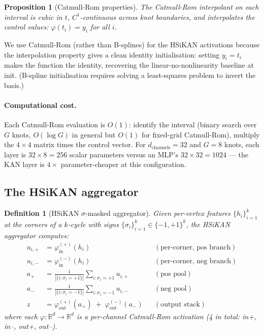 \documentclass[11pt,a4paper]{article}
\newtheorem{definition}[theorem]{Definition}
\newtheorem{proposition}[theorem]{Proposition}
\theoremstyle{remark}
\newcommand{\R}{\mathbb{R}}
\begin{document}
\begin{proposition}[Catmull-Rom properties]
The Catmull-Rom interpolant on each interval is cubic in $t$,
$C^1$-continuous across knot boundaries, and \emph{interpolates}
the control values: $\varphi(t_i) = y_i$ for all $i$.
\end{proposition}

We use Catmull-Rom (rather than B-splines) for the HSiKAN
activations because the interpolation property gives a clean
identity initialisation: setting $y_i = t_i$ makes the function
the identity, recovering the linear-no-nonlinearity baseline at
init. (B-spline initialisation requires solving a least-squares
problem to invert the basis.)

\paragraph{Computational cost.} Each Catmull-Rom evaluation is
$O(1)$: identify the interval (binary search over $G$ knots,
$O(\log G)$ in general but $O(1)$ for fixed-grid Catmull-Rom),
multiply the $4 \times 4$ matrix times the control vector. For
$d_{\text{channels}} = 32$ and $G = 8$ knots, each layer is
$32 \times 8 = 256$ scalar parameters versus an MLP's $32 \times 32 =
1024$ --- the KAN layer is $4 \times$ parameter-cheaper at this
configuration.

\subsection{The HSiKAN aggregator}\label{ssec:hsikan-aggregator}

\begin{definition}[HSiKAN $\sigma$-masked aggregator]
Given per-vertex features $\{h_i\}_{i = 1}^k$ at the corners of a
$k$-cycle with signs $\{\sigma_i\}_{i=1}^k \in \{-1, +1\}^k$, the
HSiKAN aggregator computes:
\begin{align*}
  u_{i, +} &= \varphi_{\text{in}}^{(+)}(h_i)                                 && (\text{per-corner, pos branch}) \\
  u_{i, -} &= \varphi_{\text{in}}^{(-)}(h_i)                                 && (\text{per-corner, neg branch}) \\
  a_+      &= \frac{1}{|\{i : \sigma_i = +1\}|}
              \sum_{i : \sigma_i = +1} u_{i, +}                                  && (\text{pos pool}) \\
  a_-      &= \frac{1}{|\{i : \sigma_i = -1\}|}
              \sum_{i : \sigma_i = -1} u_{i, -}                                  && (\text{neg pool}) \\
  z        &= \varphi_{\text{out}}^{(+)}(a_+) \;+\; \varphi_{\text{out}}^{(-)}(a_-) && (\text{output stack})
\end{align*}
where each $\varphi : \R^d \to \R^d$ is a per-channel Catmull-Rom
activation (4 in total: in+, in--, out+, out--).
\end{definition}
\end{document}
